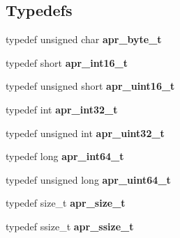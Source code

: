 \subsection*{Typedefs}
\begin{DoxyCompactItemize}
\item 
typedef unsigned char {\bfseries apr\+\_\+byte\+\_\+t}\hypertarget{group__apr__platform_gadcfa334915b4605a0052cb4ca542eb3a}{}\label{group__apr__platform_gadcfa334915b4605a0052cb4ca542eb3a}

\item 
typedef short {\bfseries apr\+\_\+int16\+\_\+t}\hypertarget{group__apr__platform_ga43c359f64f6c84d8af869539e0737df4}{}\label{group__apr__platform_ga43c359f64f6c84d8af869539e0737df4}

\item 
typedef unsigned short {\bfseries apr\+\_\+uint16\+\_\+t}\hypertarget{group__apr__platform_ga3fb87c977e28a526d872d1081411b129}{}\label{group__apr__platform_ga3fb87c977e28a526d872d1081411b129}

\item 
typedef int {\bfseries apr\+\_\+int32\+\_\+t}\hypertarget{group__apr__platform_ga21ef1e35fd3ff9be386f3cb20164ff02}{}\label{group__apr__platform_ga21ef1e35fd3ff9be386f3cb20164ff02}

\item 
typedef unsigned int {\bfseries apr\+\_\+uint32\+\_\+t}\hypertarget{group__apr__platform_ga558548a135d8a816c4787250744ea147}{}\label{group__apr__platform_ga558548a135d8a816c4787250744ea147}

\item 
typedef long {\bfseries apr\+\_\+int64\+\_\+t}\hypertarget{group__apr__platform_ga4b75afbf973dc6c8aea4ae75b044aa08}{}\label{group__apr__platform_ga4b75afbf973dc6c8aea4ae75b044aa08}

\item 
typedef unsigned long {\bfseries apr\+\_\+uint64\+\_\+t}\hypertarget{group__apr__platform_ga722b277a42230f3fd41cb5be7a76cfb4}{}\label{group__apr__platform_ga722b277a42230f3fd41cb5be7a76cfb4}

\item 
typedef size\+\_\+t {\bfseries apr\+\_\+size\+\_\+t}\hypertarget{group__apr__platform_gaaa72b2253f6f3032cefea5712a27540e}{}\label{group__apr__platform_gaaa72b2253f6f3032cefea5712a27540e}

\item 
typedef ssize\+\_\+t {\bfseries apr\+\_\+ssize\+\_\+t}\hypertarget{group__apr__platform_ga215ebb88932bee220b766263ebbfe6fa}{}\label{group__apr__platform_ga215ebb88932bee220b766263ebbfe6fa}


\end{DoxyCompactItemize}

